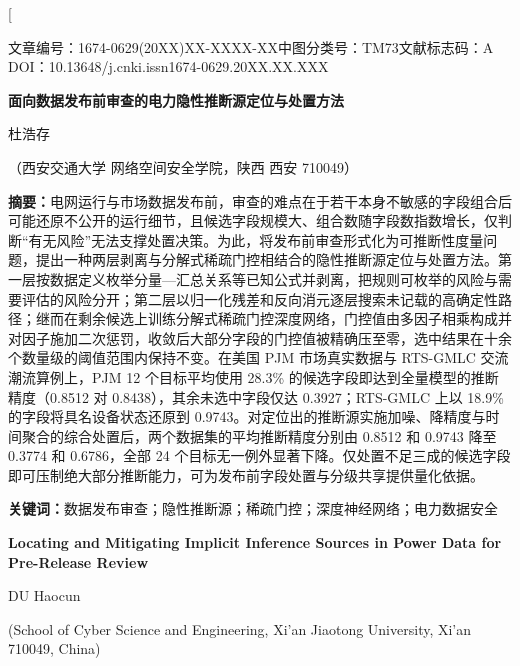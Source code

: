 \documentclass[UTF8,zihao=5,twoside]{ctexart}
\newcommand{\articleinfo}{文章编号：1674-0629(20XX)XX-XXXX-XX\quad 中图分类号：TM73\quad 文献标志码：A\\
DOI：10.13648/j.cnki.issn1674-0629.20XX.XX.XXX}
\begin{document}
\twocolumn[

\begin{center}
{\articleinfo}\par\vspace{1.0em}
{\sffamily{}\bfseries 面向数据发布前审查的电力隐性推断源定位与处置方法}\par\vspace{0.8em}
{杜浩存}\par\vspace{0.4em}
{（西安交通大学 网络空间安全学院，陕西 西安 710049）}\par\vspace{0.8em}
\end{center}

\noindent\textbf{摘要：}电网运行与市场数据发布前，审查的难点在于若干本身不敏感的字段组合后可能还原不公开的运行细节，且候选字段规模大、组合数随字段数指数增长，仅判断“有无风险”无法支撑处置决策。为此，将发布前审查形式化为可推断性度量问题，提出一种两层剥离与分解式稀疏门控相结合的隐性推断源定位与处置方法。第一层按数据定义枚举分量—汇总关系等已知公式并剥离，把规则可枚举的风险与需要评估的风险分开；第二层以归一化残差和反向消元逐层搜索未记载的高确定性路径；继而在剩余候选上训练分解式稀疏门控深度网络，门控值由多因子相乘构成并对因子施加二次惩罚，收敛后大部分字段的门控值被精确压至零，选中结果在十余个数量级的阈值范围内保持不变。在美国 PJM 市场真实数据与 RTS-GMLC 交流潮流算例上，PJM 12 个目标平均使用 28.3\% 的候选字段即达到全量模型的推断精度（0.8512 对 0.8438），其余未选中字段仅达 0.3927；RTS-GMLC 上以 18.9\% 的字段将具名设备状态还原到 0.9743。对定位出的推断源实施加噪、降精度与时间聚合的综合处置后，两个数据集的平均推断精度分别由 0.8512 和 0.9743 降至 0.3774 和 0.6786，全部 24 个目标无一例外显著下降。仅处置不足三成的候选字段即可压制绝大部分推断能力，可为发布前字段处置与分级共享提供量化依据。\par
\noindent\textbf{关键词：}数据发布审查；隐性推断源；稀疏门控；深度神经网络；电力数据安全\par\vspace{0.8em}

\begin{center}
{\bfseries\large Locating and Mitigating Implicit Inference Sources in Power Data for Pre-Release Review}\par\vspace{0.5em}
{DU Haocun}\par\vspace{0.3em}
{\small (School of Cyber Science and Engineering, Xi'an Jiaotong University, Xi'an 710049, China)}\par\vspace{0.5em}
\end{center}
\end{document}
